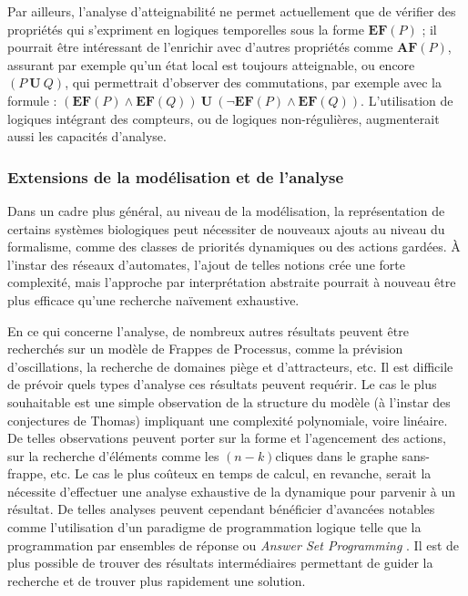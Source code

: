 Par ailleurs, l'analyse d'atteignabilité ne permet actuellement que de vérifier des propriétés
qui s'expriment en logiques temporelles sous la forme $\mathbf{EF}(P)$ ;
il pourrait être intéressant de l'enrichir avec d'autres propriétés comme
$\mathbf{AF}(P)$, assurant par exemple qu'un état local est toujours atteignable,
ou encore $(P\:\mathbf{U}\:Q)$, qui permettrait d'observer des commutations,
par exemple avec la formule :
$(\mathbf{EF}(P) \wedge \mathbf{EF}(Q))\:\mathbf{U}\:(\neg\mathbf{EF}(P) \wedge \mathbf{EF}(Q))$.
L'utilisation de logiques intégrant des compteurs,
ou de logiques non-régulières,
augmenterait aussi les capacités d'analyse.




\subsubsection*{Extensions de la modélisation et de l'analyse}

Dans un cadre plus général, au niveau de la modélisation,
la représentation de certains systèmes biologiques peut nécessiter de nouveaux ajouts au niveau du
formalisme,
comme des classes de priorités dynamiques ou des actions gardées.
À l'instar des réseaux d'automates, l'ajout de telles notions crée une forte complexité,
mais l'approche par interprétation abstraite pourrait à nouveau être plus efficace
qu'une recherche naïvement exhaustive.

En ce qui concerne l'analyse,
de nombreux autres résultats peuvent être recherchés sur un modèle de Frappes
de Processus, comme la prévision d'oscillations, la recherche
de domaines piège et d'attracteurs, etc.
Il est difficile de prévoir quels types d'analyse ces résultats peuvent requérir.
Le cas le plus souhaitable est une simple observation de la structure du modèle
(à l'instar des conjectures de Thomas) impliquant une complexité polynomiale, voire linéaire.
De telles observations peuvent porter sur la forme et l'agencement des actions,
sur la recherche d'éléments comme les $(n-k)$\nbd cliques dans le graphe sans-frappe,
etc.
Le cas le plus coûteux en temps de calcul, en revanche, serait la nécessite d'effectuer
une analyse exhaustive de la dynamique pour parvenir à un résultat.
De telles analyses peuvent cependant bénéficier d'avancées notables
comme l'utilisation d'un paradigme de programmation logique
telle que la programmation par ensembles de réponse ou \textit{Answer Set Programming}
.
Il est de plus possible de trouver des résultats intermédiaires
permettant de guider la recherche et de trouver plus rapidement une solution.



